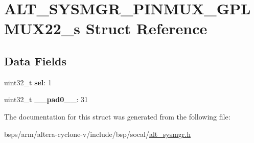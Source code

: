 \hypertarget{structALT__SYSMGR__PINMUX__GPLMUX22__s}{}\section{A\+L\+T\+\_\+\+S\+Y\+S\+M\+G\+R\+\_\+\+P\+I\+N\+M\+U\+X\+\_\+\+G\+P\+L\+M\+U\+X22\+\_\+s Struct Reference}
\label{structALT__SYSMGR__PINMUX__GPLMUX22__s}
\subsection*{Data Fields}
\begin{DoxyCompactItemize}
\item 
\mbox{\label{structALT__SYSMGR__PINMUX__GPLMUX22__s_a7996c817f73a3803bef82cf751c1fc91}} 
uint32\+\_\+t {\bfseries sel}\+: 1
\item 
\mbox{\label{structALT__SYSMGR__PINMUX__GPLMUX22__s_aefb8b9c84cba77bbdc89226c37bed4e0}} 
uint32\+\_\+t {\bfseries \+\_\+\+\_\+pad0\+\_\+\+\_\+}\+: 31
\end{DoxyCompactItemize}


The documentation for this struct was generated from the following file\+:\begin{DoxyCompactItemize}
\item 
bsps/arm/altera-\/cyclone-\/v/include/bsp/socal/\mbox{\hyperlink{alt__sysmgr_8h}{alt\+\_\+sysmgr.\+h}}\end{DoxyCompactItemize}
